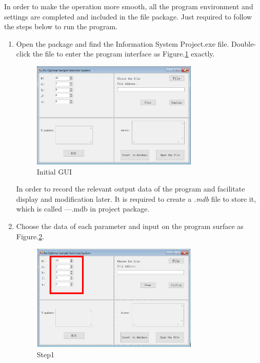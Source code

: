 In order to make the operation more smooth, all the program environment and settings are completed and included in the file package. Just required to follow the steps below to run the program.
\begin{enumerate}
\item Open the package and find the Information System Project.exe file. Double-click the file to enter the program interface as Figure.\ref{fig:init} exactly.
\begin{figure}[!htbp]
	\centering
	\includegraphics[width=0.75\textwidth]{images/initial.png}
	\caption{Initial GUI}
	\label{fig:init}
\end{figure}

In order to record the relevant output data of the program and facilitate display and modification later. It is required to create a \emph{.mdb} file to store it, which is called ---.mdb in project package.

\item Choose the data of each parameter and input on the program surface as Figure.\ref{fig:st1}.
\begin{figure}[!htbp]
	\centering
	\includegraphics[width=0.75\textwidth]{images/step1.png}
	\caption{Step1}
	\label{fig:st1}
\end{figure}


\end{enumerate}
